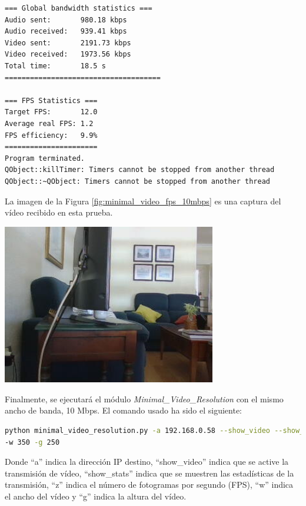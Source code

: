 \begin{lstlisting}[language=bash,basicstyle=\ttfamily\tiny]
=== Global bandwidth statistics ===
Audio sent:       980.18 kbps
Audio received:   939.41 kbps
Video sent:       2191.73 kbps
Video received:   1973.56 kbps
Total time:       18.5 s
=====================================

=== FPS Statistics ===
Target FPS:       12.0
Average real FPS: 1.2
FPS efficiency:   9.9%
======================
Program terminated.
QObject::killTimer: Timers cannot be stopped from another thread
QObject::~QObject: Timers cannot be stopped from another thread
\end{lstlisting}
\vspace{\baselineskip}

\newpage

La imagen de la Figura \ref{fig:minimal_video_fps_10mbps} es una captura del vídeo recibido en esta prueba.
\begin{center}
  \includegraphics[width = 0.7\textwidth]{images/VideoRecibido2.2.png}
  \label{fig:minimal_video_fps_10mbps}
\end{center}

\newpage

Finalmente, se ejecutará el módulo \textit{Minimal\_Video\_Resolution} con el mismo ancho de banda, 10 Mbps. El comando usado ha sido el siguiente:
\begin{lstlisting}[language=bash,basicstyle=\ttfamily\scriptsize]
python minimal_video_resolution.py -a 192.168.0.58 --show_video --show_stats -z 12 \\
-w 350 -g 250
\end{lstlisting}
Donde ``a'' indica la dirección IP destino, ``show\_video'' indica que se active la transmisión de vídeo, ``show\_stats'' indica que se muestren las estadísticas de la transmisión, ``z'' indica el número de fotogramas por segundo (FPS), ``w'' indica el ancho del vídeo y ``g'' indica la altura del vídeo.
\vspace{\baselineskip}

